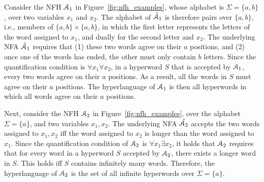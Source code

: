 \begin{example}

Consider the NFH $\mathcal{A}_1$ in Figure~\ref{fig:nfh_examples}, whose alphabet is $\Sigma = \{a,b\}$, over two variables $x_1$ and $x_2$. The alphabet of $\hat {\mathcal{A}}_1$ is therefore pairs over $\{a,b\}$, i.e., members of $\{a,b\} \times \{a,b\}$, in which the first letter represents the letters of the word assigned to $x_1$, and dually for the second letter and $x_2$.
%
The underlying NFA $\hat {\mathcal{A}}_1$ requires that (1) these two words agree on their $a$ positions, and (2) once one of the words has ended, the other must only contain $b$ letters. Since the quantification condition is $\forall x_1 \forall x_2$, in a hyperword $S$ that is accepted by $\mathcal{A}_1$, every two words agree on their $a$ positions. As a result, all the words in $S$ must agree on their $a$ positions. The hyperlanguage of $\mathcal{A}_1$ is then all hyperwords in which all words agree on their $a$ positions. 

\end{example}

\begin{example}

Next, consider the NFH $\mathcal{A}_2$ in Figure~\ref{fig:nfh_examples}, over the alphabet $\Sigma = \{a\}$, and two variables $x_1,x_2$. The underlying NFA $\hat{\mathcal{A}_2}$ accepts the two words assigned to $x_1,x_2$ iff the word assigned to $x_2$ is longer than the word assigned to $x_1$. Since the quantification condition of $\mathcal{A}_2$ is $\forall x_1 \exists x_2$, it holds that $\mathcal{A}_2$ requires that for every word in a hyperword $S$ accepted by $\mathcal{A}_2$, there exists a longer word in $S$. This holds iff $S$ contains infinitely many words. Therefore, the hyperlanguage of $\mathcal{A}_2$ is the set of all infinite hyperwords over $\Sigma = \{a\}$. 

\end{example}

